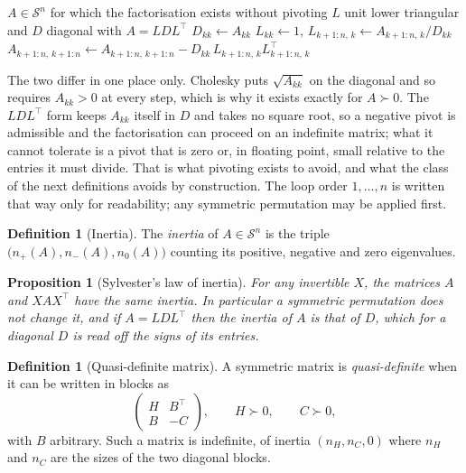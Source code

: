 \documentclass[a4paper,11pt]{book}
\theoremstyle{plain}
\newtheorem{proposition}[theorem]{Proposition}
\theoremstyle{definition}
\newtheorem{definition}[theorem]{Definition}
\theoremstyle{remark}
\numberwithin{equation}{chapter}
\numberwithin{algorithm}{chapter}
\newcommand{\Sp}{\mathcal{S}}
\begin{document}
	\begin{algorithm}[H]
		\caption{$LDL^{\top}$, right looking, with $D$ diagonal}
		\begin{algorithmic}[1]
			\Require $A\in\Sp^n$ for which the factorisation exists without pivoting
			\Ensure $L$ unit lower triangular and $D$ diagonal with $A=LDL^{\top}$
			\State $D_{kk}\gets A_{kk}$
			\State $L_{kk}\gets1$,\quad
			$L_{k+1:n,\,k}\gets A_{k+1:n,\,k}/D_{kk}$
			\State $A_{k+1:n,\,k+1:n}\gets A_{k+1:n,\,k+1:n}
			-D_{kk}\,L_{k+1:n,\,k}L_{k+1:n,\,k}^{\top}$
			\EndFor
		\end{algorithmic}
	\end{algorithm}

	The two differ in one place only. Cholesky puts $\sqrt{A_{kk}}$ on the
	diagonal and so requires $A_{kk}>0$ at every step, which is why it exists
	exactly for $A\succ0$. The $LDL^{\top}$ form keeps $A_{kk}$ itself in $D$ and
	takes no square root, so a negative pivot is admissible and the factorisation
	can proceed on an indefinite matrix; what it cannot tolerate is a pivot that
	is zero or, in floating point, small relative to the entries it must divide.
	That is what pivoting exists to avoid, and what the class of the next
	definitions avoids by construction. The loop order $1,\dots,n$ is written
	that way only for readability; any symmetric permutation may be applied
	first.

	\begin{definition}[Inertia]\label{def:inertia}
		The \emph{inertia} of $A\in\Sp^n$ is the triple
		$\bigl(n_+(A),n_-(A),n_0(A)\bigr)$ counting its positive, negative and zero
		eigenvalues.
	\end{definition}

	\begin{proposition}[Sylvester's law of inertia]\label{prop:sylvester}
		For any invertible $X$, the matrices $A$ and $XAX^{\top}$ have the same
		inertia. In particular a symmetric permutation does not change it, and if
		$A=LDL^{\top}$ then the inertia of $A$ is that of $D$, which for a diagonal
		$D$ is read off the signs of its entries.
	\end{proposition}

	\begin{definition}[Quasi-definite matrix]\label{def:quasidefinite}
		A symmetric matrix is \emph{quasi-definite} when it can be written in blocks
		as
		\begin{equation}
			\begin{pmatrix}
				H & B^{\top}\\
				B & -C
			\end{pmatrix},
			\qquad
			H\succ0,
			\qquad
			C\succ0 ,
		\end{equation}
		with $B$ arbitrary. Such a matrix is indefinite, of inertia
		$(n_H,n_C,0)$ where $n_H$ and $n_C$ are the sizes of the two diagonal
		blocks.
	\end{definition}
\end{document}
